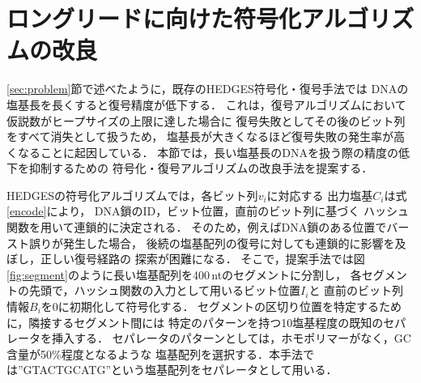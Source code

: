 \documentclass[sotsuron]{kuee}
\begin{document}
\section{ロングリードに向けた符号化アルゴリズムの改良} \label{long_read_encoding}
\ref{sec:problem}節で述べたように，既存のHEDGES符号化・復号手法では
DNAの塩基長を長くすると復号精度が低下する．
これは，復号アルゴリズムにおいて仮説数がヒープサイズの上限に達した場合に
復号失敗としてその後のビット列をすべて消失として扱うため，
塩基長が大きくなるほど復号失敗の発生率が高くなることに起因している．
本節では，長い塩基長のDNAを扱う際の精度の低下を抑制するための
符号化・復号アルゴリズムの改良手法を提案する．

HEDGESの符号化アルゴリズムでは，各ビット列$v_i$に対応する
出力塩基$C_i$は式\eqref{encode}により，
DNA鎖のID，ビット位置，直前のビット列に基づく
ハッシュ関数を用いて連鎖的に決定される．
そのため，例えばDNA鎖のある位置でバースト誤りが発生した場合，
後続の塩基配列の復号に対しても連鎖的に影響を及ぼし，正しい復号経路の
探索が困難になる．
そこで，提案手法では図\ref{fig:segment}のように長い塩基配列を400\,ntのセグメントに分割し，
各セグメントの先頭で，ハッシュ関数の入力として用いるビット位置$I_i$と
直前のビット列情報$B_i$を0に初期化して符号化する．
セグメントの区切り位置を特定するために，隣接するセグメント間には
特定のパターンを持つ10塩基程度の既知のセパレータを挿入する．
セパレータのパターンとしては，ホモポリマーがなく，GC含量が50\%程度となるような
塩基配列を選択する．本手法では”GTACTGCATG”という塩基配列をセパレータとして用いる．
\end{document}
